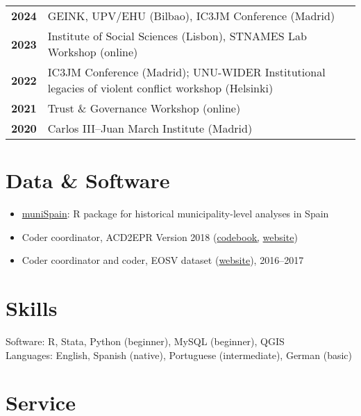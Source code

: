 \documentclass[a4paper, 12pt]{article}
\begin{document}
\begin{tabular}{lp{15cm}}
\textbf{2024} & GEINK, UPV/EHU (Bilbao), IC3JM Conference (Madrid) \\
\textbf{2023} & Institute of Social Sciences (Lisbon), STNAMES Lab Workshop (online) \\
\textbf{2022} & IC3JM Conference (Madrid); UNU-WIDER Institutional legacies of violent conflict workshop (Helsinki) \\
\textbf{2021} & Trust \& Governance Workshop (online) \\
\textbf{2020} & Carlos III--Juan March Institute (Madrid) \\
\end{tabular}

\section*{Data \& Software}

\begin{itemize}[leftmargin=*, nolistsep]
  \item \href{https://github.com/franvillamil/muniSpain}{muniSpain}: R package for historical municipality-level analyses in Spain
	\item Coder coordinator, ACD2EPR Version 2018 (\href{https://icr.ethz.ch/data/epr/acd2epr/ACD2EPR-2018_Codebook.pdf}{codebook,} \href{https://icr.ethz.ch/data/epr/acd2epr/}{website})
	\item Coder coordinator and coder, EOSV dataset (\href{https://snis.ch/project/civilian-victimization-conflict-escalation/}{website}), 2016--2017
\end{itemize}

\section*{Skills}

Software: R, Stata, Python (beginner), MySQL (beginner), QGIS\\
Languages: English, Spanish (native), Portuguese (intermediate), German (basic)

\section*{Service}
\end{document}
